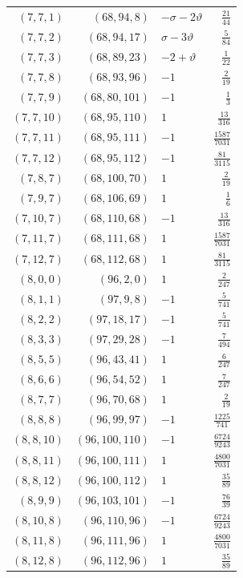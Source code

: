 \begin{longtable}{rrlr}
$(7,7,1)$ & $(68,94,8)$ & $-\sigma-2\vartheta$ & $\frac{21}{44}$\\
$(7,7,2)$ & $(68,94,17)$ & $\sigma-3\vartheta$ & $\frac{5}{84}$\\
$(7,7,3)$ & $(68,89,23)$ & $-2+\vartheta$ & $\frac{1}{22}$\\
$(7,7,8)$ & $(68,93,96)$ & $-1$ & $\frac{2}{19}$\\
$(7,7,9)$ & $(68,80,101)$ & $-1$ & $\frac{1}{3}$\\
$(7,7,10)$ & $(68,95,110)$ & $1$ & $\frac{13}{316}$\\
$(7,7,11)$ & $(68,95,111)$ & $-1$ & $\frac{1587}{7031}$\\
$(7,7,12)$ & $(68,95,112)$ & $-1$ & $\frac{81}{3115}$\\
$(7,8,7)$ & $(68,100,70)$ & $1$ & $\frac{2}{19}$\\
$(7,9,7)$ & $(68,106,69)$ & $1$ & $\frac{1}{6}$\\
$(7,10,7)$ & $(68,110,68)$ & $-1$ & $\frac{13}{316}$\\
$(7,11,7)$ & $(68,111,68)$ & $1$ & $\frac{1587}{7031}$\\
$(7,12,7)$ & $(68,112,68)$ & $1$ & $\frac{81}{3115}$\\
$(8,0,0)$ & $(96,2,0)$ & $1$ & $\frac{2}{247}$\\
$(8,1,1)$ & $(97,9,8)$ & $-1$ & $\frac{5}{741}$\\
$(8,2,2)$ & $(97,18,17)$ & $-1$ & $\frac{5}{741}$\\
$(8,3,3)$ & $(97,29,28)$ & $-1$ & $\frac{7}{494}$\\
$(8,5,5)$ & $(96,43,41)$ & $1$ & $\frac{6}{247}$\\
$(8,6,6)$ & $(96,54,52)$ & $1$ & $\frac{7}{247}$\\
$(8,7,7)$ & $(96,70,68)$ & $1$ & $\frac{2}{19}$\\
$(8,8,8)$ & $(96,99,97)$ & $-1$ & $\frac{1225}{741}$\\
$(8,8,10)$ & $(96,100,110)$ & $-1$ & $\frac{6724}{9243}$\\
$(8,8,11)$ & $(96,100,111)$ & $1$ & $\frac{4800}{7031}$\\
$(8,8,12)$ & $(96,100,112)$ & $1$ & $\frac{35}{89}$\\
$(8,9,9)$ & $(96,103,101)$ & $-1$ & $\frac{76}{39}$\\
$(8,10,8)$ & $(96,110,96)$ & $-1$ & $\frac{6724}{9243}$\\
$(8,11,8)$ & $(96,111,96)$ & $1$ & $\frac{4800}{7031}$\\
$(8,12,8)$ & $(96,112,96)$ & $1$ & $\frac{35}{89}$\\

\end{longtable}
